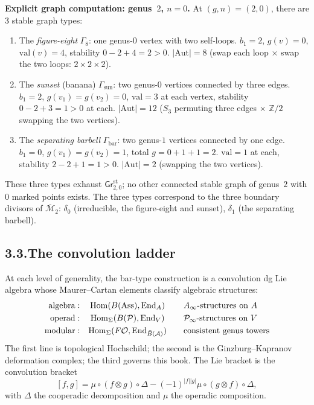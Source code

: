 \documentclass[11pt,reqno]{amsart}
\theoremstyle{definition}
\theoremstyle{remark}
\providecommand{\cA}{\mathcal{A}}
\providecommand{\cM}{\mathcal{M}}
\providecommand{\cO}{\mathcal{O}}
\providecommand{\cP}{\mathcal{P}}
\providecommand{\barB}{\bar{B}}
\providecommand{\Hom}{\mathrm{Hom}}
\providecommand{\Aut}{\mathrm{Aut}}
\providecommand{\bZ}{\mathbb{Z}}
\providecommand{\Ass}{\mathrm{Ass}}
\providecommand{\End}{\mathrm{End}}
\numberwithin{equation}{section}
\begin{document}
\medskip
\noindent\textbf{Explicit graph computation: genus~$2$, $n=0$.}\enspace
At $(g,n)=(2,0)$, there are $3$ stable graph types:
\begin{enumerate}[label=(\alph*)]
\item The \emph{figure-eight} $\Gamma_8$: one genus-$0$ vertex with
two self-loops. $b_1=2$, $g(v)=0$, $\mathrm{val}(v)=4$, stability
$0-2+4=2>0$. $|\Aut|=8$ (swap each loop $\times$ swap the two loops:
$2\times 2\times 2$).
\item The \emph{sunset} (banana) $\Gamma_{\mathrm{sun}}$: two
genus-$0$ vertices connected by three edges. $b_1=2$, $g(v_1)=g(v_2)=0$,
$\mathrm{val}=3$ at each vertex, stability $0-2+3=1>0$ at each.
$|\Aut|=12$ ($S_3$ permuting three edges $\times$ $\bZ/2$ swapping
the two vertices).
\item The \emph{separating barbell} $\Gamma_{\mathrm{bar}}$: two
genus-$1$ vertices connected by one edge. $b_1=0$, $g(v_1)=g(v_2)=1$,
total $g=0+1+1=2$. $\mathrm{val}=1$ at each, stability
$2-2+1=1>0$. $|\Aut|=2$ (swapping the two vertices).
\end{enumerate}
These three types exhaust $\mathsf{Gr}^{\mathrm{st}}_{2,0}$; no other
connected stable graph of genus~$2$ with $0$ marked points exists.
The three types correspond to the three boundary divisors of
$\overline{\cM}_2$: $\delta_0$ (irreducible, the figure-eight and
sunset), $\delta_1$ (the separating barbell).

\subsection*{3.3.\enspace The convolution ladder}

At each level of generality, the bar-type construction is a
convolution dg Lie algebra whose Maurer--Cartan elements classify
algebraic structures:
\begin{equation}\label{eq:preface-convolution-ladder}
\begin{array}{r@{\;:\quad}c@{\qquad}l}
\text{algebra} & \Hom(B(\Ass),\End_A) & A_\infty\text{-structures on }A\\[3pt]
\text{operad} & \Hom_\Sigma(B(\cP),\End_V) & \cP_\infty\text{-structures on }V\\[3pt]
\text{modular} & \Hom_\Sigma(F\cO,\End_{\barB(\cA)}) & \text{consistent genus towers}
\end{array}
\end{equation}
The first line is topological Hochschild; the second is the Ginzburg--Kapranov
deformation complex; the third governs this book. The Lie bracket is
the convolution bracket
\[
[f,g]=\mu\circ(f\otimes g)\circ\Delta-(-1)^{|f||g|}\mu\circ(g\otimes f)\circ\Delta,
\]
with $\Delta$ the cooperadic decomposition and $\mu$ the operadic
composition.
\end{document}
